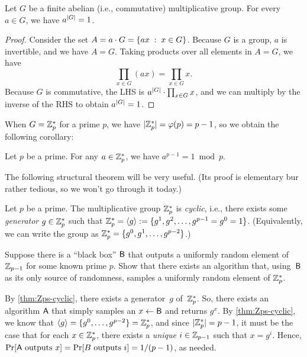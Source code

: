\documentclass[11pt]{article}
\begin{document}
\begin{theorem}
  \label{thm:euler-thm}
  Let $G$ be a finite abelian (i.e., commutative) multiplicative group.
  For every $a \in G$, we have $a^{\lvert G\rvert} = 1$.
\end{theorem}

\begin{proof}
  Consider the set $A = a \cdot G = \{ ax\; :\; x \in G\}$.
  Because $G$ is a group, $a$ is invertible, and we have $A = G$.
  Taking products over all elements in $A = G$, we have \[ \prod_{x \in G} (ax) = \prod_{x \in G} x.
  \] Because $G$ is commutative, the LHS is $a^{\lvert G\rvert} \cdot \prod_{x \in G} x$, and we can multiply by the inverse of the RHS to obtain $a^{\lvert G\rvert} = 1$.
\end{proof}

When $G = \mathbb{Z}_p^{*}$ for a prime $p$, we have $\lvert\mathbb{Z}_p^{*}\rvert = \varphi(p) = p-1$, so we obtain the following corollary:

\begin{corollary}
  Let $p$ be a prime.
  For any $a \in \mathbb{Z}_p^{*}$, we have $a^{p-1} = 1 \bmod p$.
\end{corollary}

The following structural theorem will be very useful.
(Its proof is elementary bur rather tedious, so we won't go through it today.)

\begin{theorem}
  \label{thm:Zps-cyclic}
  Let $p$ be a prime.
  The multiplicative group $\mathbb{Z}_p^{*}$ is \emph{cyclic}, i.e., there exists some \emph{generator} $g \in \mathbb{Z}_p^{*}$ such that $\mathbb{Z}_p^{*} = \langle g \rangle := \{g^{1}, g^{2}, \ldots, g^{p-1}=g^{0}=1\}$.
  (Equivalently, we can write the group as $\mathbb{Z}_p^{*} = \{g^{0}, g^{1}, \ldots, g^{p-2}\}$.)
\end{theorem}

\begin{question}
  Suppose there is a ``black box'' \(\mathsf{B}\) that outputs a uniformly random element of \(\mathbb{Z}_{p-1}\) for some known prime \(p\).
  Show that there exists an algorithm that, using~\(\mathsf{B}\) as its only source of randomness, samples a uniformly random element of \(\mathbb{Z}_p^*\).
\end{question}

\begin{answer}
  By \cref{thm:Zps-cyclic}, there exists a generator~\(g\) of~\(\mathbb{Z}_p^{*}\).
  So, there exists an algorithm \(\mathsf{A}\) that simply samples an $x \gets \mathsf{B}$ and returns \(g^{x}\).
  By \cref{thm:Zps-cyclic}, we know that \(\langle g\rangle = \{g^0, \ldots, g^{p-2}\} = \mathbb{Z}_p^*\), and since \(\lvert\mathbb{Z}_p^*\rvert = p - 1\), it must be the case that for each \(x \in \mathbb{Z}_p^*\), there exists a \emph{unique} \(i \in \mathbb{Z}_{p-1}\) such that \(x = g^i\).
  Hence, \(\Pr[\mathsf{A} \text{ outputs } x] = \Pr[B \text{ outputs } i] = 1/(p-1)\), as needed.
\end{answer}
\end{document}
